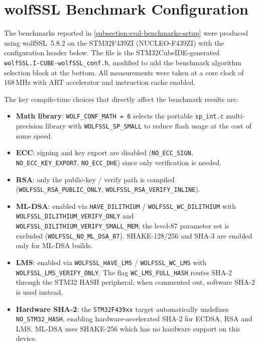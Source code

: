 \chapter{wolfSSL Benchmark Configuration}
\label{appendix:wolfssl-config}

The benchmarks reported in \autoref{subsection:eval-benchmarks-setup} were produced using wolfSSL~5.8.2 on the STM32F439ZI (NUCLEO-F439ZI) with the configuration header below.
The file is the STM32CubeIDE-generated \texttt{wolfSSL.I-CUBE-wolfSSL\_conf.h}, modified to add the benchmark algorithm selection block at the bottom.
All measurements were taken at a core clock of 168\,MHz with ART accelerator and instruction cache enabled.

The key compile-time choices that directly affect the benchmark results are:

\begin{itemize}
    \item \textbf{Math library}: \texttt{WOLF\_CONF\_MATH = 6} selects the portable \texttt{sp\_int.c} multi-precision library with \texttt{WOLFSSL\_SP\_SMALL} to reduce flash usage at the cost of some speed.
    \item \textbf{ECC}: signing and key export are disabled (\texttt{NO\_ECC\_SIGN}, \texttt{NO\_ECC\_KEY\_EXPORT}, \texttt{NO\_ECC\_DHE}) since only verification is needed.
    \item \textbf{RSA}: only the public-key / verify path is compiled (\texttt{WOLFSSL\_RSA\_PUBLIC\_ONLY}, \texttt{WOLFSSL\_RSA\_VERIFY\_INLINE}).
    \item \textbf{ML-DSA}: enabled via \texttt{HAVE\_DILITHIUM} / \texttt{WOLFSSL\_WC\_DILITHIUM} with \texttt{WOLFSSL\_DILITHIUM\_VERIFY\_ONLY} and \texttt{WOLFSSL\_DILITHIUM\_VERIFY\_SMALL\_MEM}; the level-87 parameter set is excluded (\texttt{WOLFSSL\_NO\_ML\_DSA\_87}). SHAKE-128/256 and SHA-3 are enabled only for ML-DSA builds.
    \item \textbf{LMS}: enabled via \texttt{WOLFSSL\_HAVE\_LMS} / \texttt{WOLFSSL\_WC\_LMS} with \texttt{WOLFSSL\_LMS\_VERIFY\_ONLY}. The flag \texttt{WC\_LMS\_FULL\_HASH} routes SHA-2 through the STM32 HASH peripheral; when commented out, software SHA-2 is used instead.
    \item \textbf{Hardware SHA-2}: the \texttt{STM32F439xx} target automatically undefines \texttt{NO\_STM32\_HASH}, enabling hardware-accelerated SHA-2 for ECDSA, RSA and LMS. ML-DSA uses SHAKE-256 which has no hardware support on this device.
\end{itemize}


